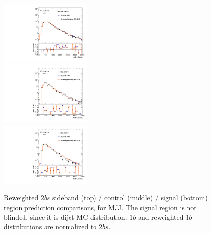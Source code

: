 \begin{figure}[htbp!]
\begin{center}
\includegraphics[width=0.4\textwidth,angle=-90]{figures/boosted/AppendixReweight/Compare/Dijet_Sideband_directcompare_mHH_l_1.pdf}\\
\includegraphics[width=0.4\textwidth,angle=-90]{figures/boosted/AppendixReweight/Compare/Dijet_Control_directcompare_mHH_l_1.pdf}\\
\includegraphics[width=0.4\textwidth,angle=-90]{figures/boosted/AppendixReweight/Compare/Dijet_Signal_directcompare_mHH_l_1.pdf}
\caption{Reweighted $2bs$ sideband (top) / control (middle) / signal (bottom) region prediction comparisons, for MJJ. The signal region is not blinded, since it is dijet MC distribution. $1b$ and reweighted $1b$ distributions are normalized to $2bs$.}
\label{fig:app-rw-comp-dijet-2bs}
\end{center}
\end{figure}

\clearpage